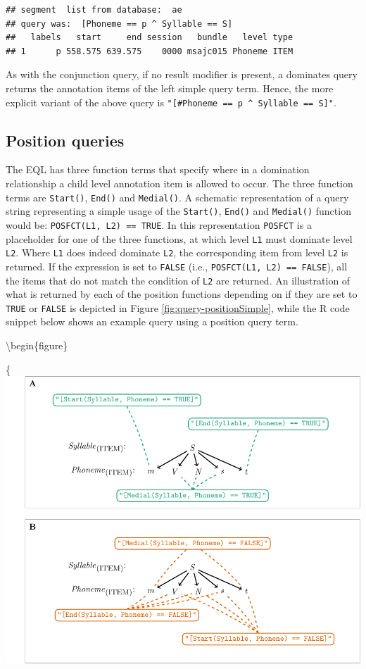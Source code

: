 \documentclass[]{book}
\theoremstyle{definition}
\theoremstyle{definition}
\theoremstyle{definition}
\theoremstyle{remark}
\begin{document}
\begin{verbatim}
## segment  list from database:  ae 
## query was:  [Phoneme == p ^ Syllable == S] 
##   labels   start     end session   bundle   level type
## 1      p 558.575 639.575    0000 msajc015 Phoneme ITEM
\end{verbatim}

As with the conjunction query, if no result modifier is present, a
dominates query returns the annotation items of the left simple query
term. Hence, the more explicit variant of the above query is
\texttt{"{[}\#Phoneme\ ==\ p\ \^{}\ Syllable\ ==\ S{]}"}.

\hypertarget{subsec:query_positionQueries}{%
\subsection{Position queries}\label{subsec:query_positionQueries}}

The EQL has three function terms that specify where in a domination
relationship a child level annotation item is allowed to occur. The
three function terms are \texttt{Start()}, \texttt{End()} and
\texttt{Medial()}. A schematic representation of a query string
representing a simple usage of the \texttt{Start()}, \texttt{End()} and
\texttt{Medial()} function would be: \texttt{POSFCT(L1,\ L2)\ ==\ TRUE}.
In this representation \texttt{POSFCT} is a placeholder for one of the
three functions, at which level \texttt{L1} must dominate level
\texttt{L2}. Where \texttt{L1} does indeed dominate \texttt{L2}, the
corresponding item from level \texttt{L2} is returned. If the expression
is set to \texttt{FALSE} (i.e., \texttt{POSFCT(L1,\ L2)\ ==\ FALSE}),
all the items that do not match the condition of \texttt{L2} are
returned. An illustration of what is returned by each of the position
functions depending on if they are set to \texttt{TRUE} or
\texttt{FALSE} is depicted in Figure \ref{fig:query-positionSimple},
while the R code snippet below shows an example query using a position
query term.

\textbackslash{}begin\{figure\}

\{\centering \includegraphics[width=0.75\linewidth]{pics/positionSimple}
\end{document}
